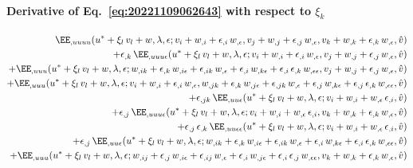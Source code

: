 \paragraph{Derivative of Eq.~\eqref{eq:20221109062643} with respect to \(\xi_k\)}

\begin{equation}
  \begin{aligned}[b]
    \EE_{,uuuu}(u^\ast + \xi_l \, v_l + w, \lambda, \epsilon; v_i + w_{,i} + \epsilon_{,i} \,  w_{,\epsilon}, v_j + w_{,j} + \epsilon_{,j} \, w_{,\epsilon}, v_k + w_{,k} + \epsilon_{,k} \, w_{,\epsilon}, \hat{v})&\\
    + \epsilon_{,k} \, \EE_{,uuu\epsilon}(u^\ast + \xi_l \, v_l + w, \lambda, \epsilon; v_i + w_{,i} + \epsilon_{,i} \,  w_{,\epsilon}, v_j + w_{,j} + \epsilon_{,j} \, w_{,\epsilon}, \hat{v})&\\
    + \EE_{,uuu}(u^\ast + \xi_l \, v_l + w, \lambda, \epsilon; w_{,ik} + \epsilon_{,k} \, w_{,i\epsilon} + \epsilon_{,ik} \,  w_{,\epsilon} + \epsilon_{,i} \,  w_{,k\epsilon} + \epsilon_{,i} \, \epsilon_{,k}\,  w_{,\epsilon\epsilon}, v_j + w_{,j} + \epsilon_{,j} \, w_{,\epsilon}, \hat{v})&\\
    + \EE_{,uuu}(u^\ast + \xi_l \, v_l + w, \lambda, \epsilon; v_i + w_{,i} + \epsilon_{,i} \,  w_{,\epsilon}, w_{,jk} + \epsilon_{,k} \, w_{,j\epsilon} + \epsilon_{,jk} \,  w_{,\epsilon} + \epsilon_{,j} \,  w_{,k\epsilon} + \epsilon_{,j} \, \epsilon_{,k}\,  w_{,\epsilon\epsilon}, \hat{v})&\\
    + \epsilon_{,jk} \, \EE_{,uu\epsilon}(u^\ast + \xi_l \, v_l + w, \lambda, \epsilon; v_i + w_{,i} + w_{,\epsilon} \, \epsilon_{,i}, \hat{v})&\\
    + \epsilon_{,j} \, \EE_{,uuu\epsilon}(u^\ast + \xi_l \, v_l + w, \lambda, \epsilon; v_i + w_{,i} + w_{,\epsilon} \, \epsilon_{,i},  v_k + w_{,k} + \epsilon_{,k} \, w_{,\epsilon}, \hat{v})&\\
    + \epsilon_{,j} \, \epsilon_{,k} \, \EE_{,uu\epsilon\epsilon}(u^\ast + \xi_l \, v_l + w, \lambda, \epsilon; v_i + w_{,i} + w_{,\epsilon} \, \epsilon_{,i}, \hat{v})&\\
    + \epsilon_{,j} \, \EE_{,uu\epsilon}(u^\ast + \xi_l \, v_l + w, \lambda, \epsilon; w_{,ik} + \epsilon_{,k} \, w_{,i\epsilon} + \epsilon_{,ik} \,  w_{,\epsilon} + \epsilon_{,i} \,  w_{,k\epsilon} + \epsilon_{,i} \, \epsilon_{,k}\,  w_{,\epsilon\epsilon}, \hat{v})&\\
    + \EE_{,uuu}(u^\ast + \xi_l \, v_l + w, \lambda, \epsilon; w_{,ij} + \epsilon_{,j} \, w_{,i\epsilon} + \epsilon_{,ij} \, w_{,\epsilon} + \epsilon_{,i} \, w_{,j\epsilon} + \epsilon_{,i} \, \epsilon_{,j} \, w_{,\epsilon\epsilon},  v_k + w_{,k} + \epsilon_{,k} \, w_{,\epsilon}, \hat{v})&\\

\end{aligned}
\end{equation}
